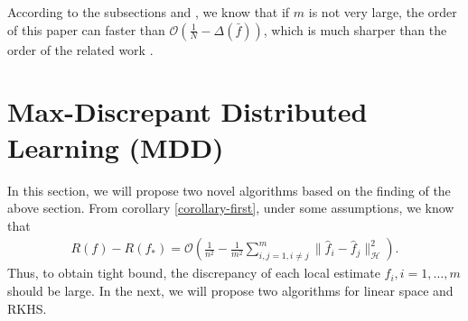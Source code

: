 \documentclass{article}
\begin{document}
According to the subsections \label{subsection-3.1} and \label{subsection-3.2},
we know that if $m$ is not very large,
the order of this paper can faster than $\mathcal{O}\left(\frac{1}{N}-\Delta(\bar{f})\right)$,
which is much sharper than the order of the related work \cite{zhang2012communication,Zhang2013,lin2017distributed}.
\section{Max-Discrepant Distributed Learning (MDD)}
In this section, we will propose two novel algorithms based on the finding of the above section.
From corollary \ref{corollary-first}, under some assumptions, we know that
  \begin{align*}
     R(f)-R(f_\ast)=\mathcal{O}\left(\frac{1}{n^2}-\frac{1}{m^2}\sum_{i,j=1,i\not=j}^m\|\hat{f}_i-\hat{f}_j\|_\mathcal{H}^2\right).
\end{align*}
Thus, to obtain tight bound, the discrepancy of each local estimate $\hat{f}_i, i=1,\ldots,m$ should be large.
In the next, we will propose two algorithms for linear space and RKHS.
\end{document}
